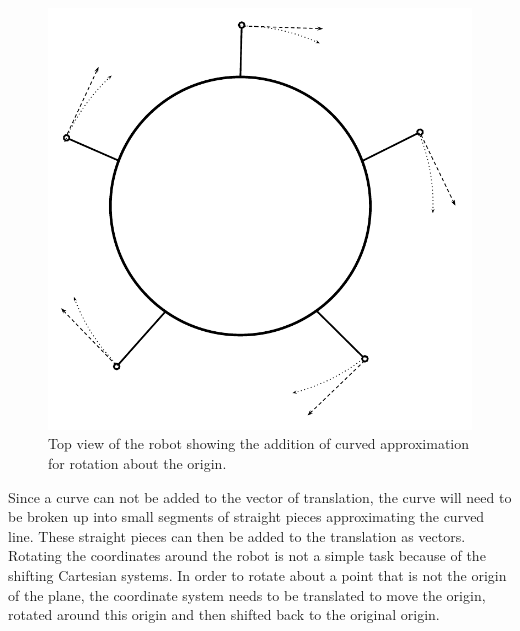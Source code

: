 \FloatBarrier
\begin{figure}[h]
\centering
\includegraphics[scale = 1]{pics/Body_Layout_5.pdf}
\caption{Top view of the robot showing the addition of curved approximation for rotation about the origin.}
\label{fig:Body_layout_5}
\end{figure}
\FloatBarrier

Since a curve can not be added to  the vector of translation, the curve will need to be broken up into small segments of straight pieces approximating the curved line. These straight pieces can then be added to the translation as vectors. Rotating the coordinates around the robot is not a simple task because of the shifting Cartesian systems. In order to rotate about a point that is not the origin of the plane, the coordinate system needs to be translated to move the origin, rotated around this origin and then shifted back to the original origin.

